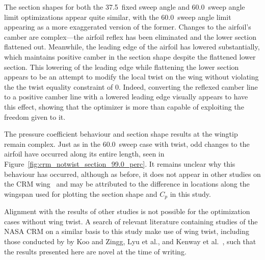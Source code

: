The section shapes for both the 37.5\degree\ fixed sweep angle and 60.0\degree\ sweep angle limit optimizations appear quite similar, with the 60.0\degree\ sweep angle limit appearing as a more exaggerated version of the former. 
Changes to the airfoil's camber are complex—the airfoil reflex has been eliminated and the lower section flattened out. Meanwhile, the leading edge of the airfoil has lowered substantially, which maintains positive camber in the section shape despite the flattened lower section. This lowering of the leading edge while flattening the lower section appears to be an attempt to modify the local twist on the wing without violating the the twist equality constraint of 0\degree. Indeed, converting the reflexed camber line to a positive camber line with a lowered leading edge visually appears to have this effect, showing that the optimizer is more than capable of exploiting the freedom given to it. 

The pressure coefficient behaviour and section shape results at the wingtip remain complex. Just as in the 60.0\degree\ sweep case with twist, odd changes to the airfoil have occurred along its entire length, seen in Figure~\ref{fig:crm_notwist_section_99.0_perc}.
It remains unclear why this behaviour has occurred, although as before, it does not appear in other studies on the CRM wing~\cite{martins_aerodynamic_2022, koo_investigation_2018, shi-dong_adjoint-based_2017, lyu_aerodynamic_2015, kenway_multipoint_2015} and may be attributed to the difference in locations along the wingspan used for plotting the section shape and $C_p$ in this study.

Alignment with the results of other studies is not possible for the optimization cases without wing twist. A search of relevant literature containing studies of the NASA CRM on a similar basis to this study make use of wing twist, including those conducted by by Koo and Zingg, Lyu et al., and Kenway et al.~\cite{koo_investigation_2018, lyu_aerodynamic_2015, kenway_multipoint_2015}, such that the results presented here are novel at the time of writing.

